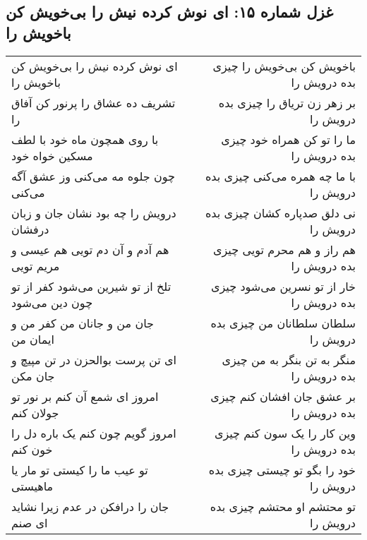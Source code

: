 \begin{center}
\section*{غزل شماره ۱۵: ای نوش کرده نیش را بی‌خویش کن باخویش را}
\label{sec:0015}
\begin{longtable}{l p{0.5cm} r}
ای نوش کرده نیش را بی‌خویش کن باخویش را
&&
باخویش کن بی‌خویش را چیزی بده درویش را
\\
تشریف ده عشاق را پرنور کن آفاق را
&&
بر زهر زن تریاق را چیزی بده درویش را
\\
با روی همچون ماه خود با لطف مسکین خواه خود
&&
ما را تو کن همراه خود چیزی بده درویش را
\\
چون جلوه مه می‌کنی وز عشق آگه می‌کنی
&&
با ما چه همره می‌کنی چیزی بده درویش را
\\
درویش را چه بود نشان جان و زبان درفشان
&&
نی دلق صدپاره کشان چیزی بده درویش را
\\
هم آدم و آن دم تویی هم عیسی و مریم تویی
&&
هم راز و هم محرم تویی چیزی بده درویش را
\\
تلخ از تو شیرین می‌شود کفر از تو چون دین می‌شود
&&
خار از تو نسرین می‌شود چیزی بده درویش را
\\
جان من و جانان من کفر من و ایمان من
&&
سلطان سلطانان من چیزی بده درویش را
\\
ای تن پرست بوالحزن در تن مپیچ و جان مکن
&&
منگر به تن بنگر به من چیزی بده درویش را
\\
امروز ای شمع آن کنم بر نور تو جولان کنم
&&
بر عشق جان افشان کنم چیزی بده درویش را
\\
امروز گویم چون کنم یک باره دل را خون کنم
&&
وین کار را یک سون کنم چیزی بده درویش را
\\
تو عیب ما را کیستی تو مار یا ماهیستی
&&
خود را بگو تو چیستی چیزی بده درویش را
\\
جان را درافکن در عدم زیرا نشاید ای صنم
&&
تو محتشم او محتشم چیزی بده درویش را
\\
\end{longtable}
\end{center}
